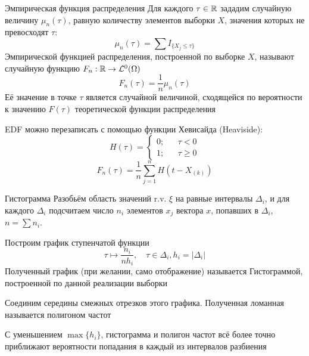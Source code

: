 \begin{dfn}{Эмпирическая функция распределения}
Для каждого $\tau\in\mathbb R$ зададим случайную величину $\mu_n(\tau)$,
равную количеству элементов выборки $X$,
значения которых не превосходят $\tau$:
$$\mu_n(\tau) = \sum I_{ \{ X_j \leq \tau \} }$$
Эмпирической функцией распределения, построенной по выборке $X$,
называют случайную функцию $F_n: \mathbb R\to \mathcal L^{0}(\Omega)$
$$F_n(\tau) = \frac{1}{n} \mu_n(\tau)$$
Её значение в точке $\tau$ является случайной величиной,
сходящейся по вероятности к значению $F(\tau)$
теоретической функции распределения

\begin{mbox}
EDF можно перезаписать с помощью функции Хевисайда (Heaviside):
\nopagebreak
$$H(\tau) =
\left\{\begin{aligned}
0; && \tau < 0 \\
1; && \tau \geq 0
\end{aligned}\right.$$
$$F_n(\tau) = \frac{1}{n} \sum_{j=1}^n H(t - X_{(k)})$$
\end{mbox}
\end{dfn}

\begin{dfn}{Гистограмма}
Разобьём область значений r.v. $\xi$ на равные интервалы $\Delta_i$,
и для каждого $\Delta_i$ подсчитаем число $n_i$ элементов $x_j$ вектора $x$,
попавших в $\Delta_i$, $n = \sum n_i$.

Построим график ступенчатой функции $$\tau\mapsto \frac{n_i}{n h_i},\quad \tau\in\Delta_i, h_i=|\Delta_i|$$
Полученный график (при желании, само отображение) называется Гистограммой,
построенной по данной реализации выборки

Соединим середины смежных отрезков этого графика.
Полученная ломанная называется полигоном частот

С уменьшением $\max\{h_i\}$,
гистограмма и полигон частот всё более точно приближают
вероятности попадания в каждый из интервалов разбиения
\end{dfn}
